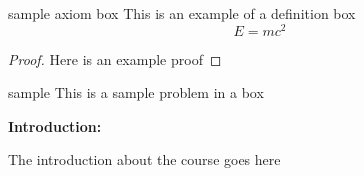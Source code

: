 \documentclass[10pt]{article}
\begin{document}
\begin{axiombox}{sample axiom box}
This is an example of a definition box
\begin{equation}
E = mc^2
\end{equation}
\end{axiombox}


\begin{proof}
Here is an example proof
\end{proof}



\begin{example}{sample}
This is a sample problem in a box
\end{example}


\begin{center}
  \textbf{Introduction:}

The introduction about the course goes here


\end{center}
\tableofcontents



\newpage

\end{document}
